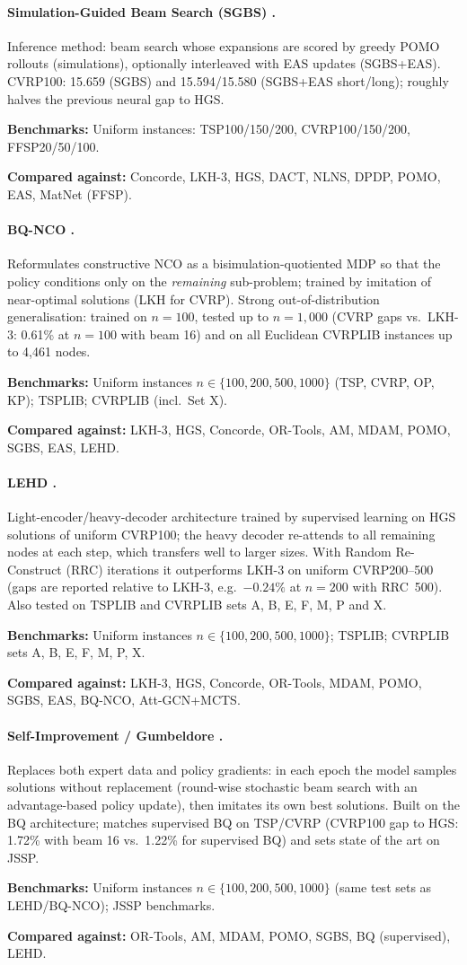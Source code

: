 \documentclass[11pt]{article}
\newcommand{\benchline}[1]{\par\smallskip\noindent\textbf{Benchmarks:} #1}
\newcommand{\baseline}[1]{\par\noindent\textbf{Compared against:} #1}
\begin{document}
\paragraph{Simulation-Guided Beam Search (SGBS) \citep{choo_simulation-guided_2022}.}
Inference method: beam search whose expansions are scored by greedy POMO rollouts
(simulations), optionally interleaved with EAS updates (SGBS+EAS). CVRP100: 15.659 (SGBS)
and 15.594/15.580 (SGBS+EAS short/long); roughly halves the previous neural gap to HGS.
\benchline{Uniform instances: TSP100/150/200, CVRP100/150/200, FFSP20/50/100.}
\baseline{Concorde, LKH-3, HGS, DACT, NLNS, DPDP, POMO, EAS, MatNet (FFSP).}

\paragraph{BQ-NCO \citep{drakulic_bq-nco_2023}.}
Reformulates constructive NCO as a bisimulation-quotiented MDP so that the policy
conditions only on the \emph{remaining} sub-problem; trained by imitation of near-optimal
solutions (LKH for CVRP). Strong out-of-distribution generalisation: trained on $n=100$,
tested up to $n=1{,}000$ (CVRP gaps vs.\ LKH-3: 0.61\% at $n{=}100$ with beam 16) and on
all Euclidean CVRPLIB instances up to 4{,}461 nodes.
\benchline{Uniform instances $n\in\{100,200,500,1000\}$ (TSP, CVRP, OP, KP); TSPLIB;
CVRPLIB (incl.\ Set X).}
\baseline{LKH-3, HGS, Concorde, OR-Tools, AM, MDAM, POMO, SGBS, EAS, LEHD.}

\paragraph{LEHD \citep{luo_neural_2023}.}
Light-encoder/heavy-decoder architecture trained by supervised learning on HGS solutions
of uniform CVRP100; the heavy decoder re-attends to all remaining nodes at each step,
which transfers well to larger sizes. With Random Re-Construct (RRC) iterations it
outperforms LKH-3 on uniform CVRP200--500 (gaps are reported relative to LKH-3, e.g.\
$-0.24\%$ at $n{=}200$ with RRC~500). Also tested on TSPLIB and CVRPLIB sets A, B, E, F,
M, P and X.
\benchline{Uniform instances $n\in\{100,200,500,1000\}$; TSPLIB; CVRPLIB sets A, B, E,
F, M, P, X.}
\baseline{LKH-3, HGS, Concorde, OR-Tools, MDAM, POMO, SGBS, EAS, BQ-NCO,
Att-GCN+MCTS.}

\paragraph{Self-Improvement / Gumbeldore \citep{pirnay_self-improvement_2024}.}
Replaces both expert data and policy gradients: in each epoch the model samples solutions
without replacement (round-wise stochastic beam search with an advantage-based policy
update), then imitates its own best solutions. Built on the BQ architecture; matches
supervised BQ on TSP/CVRP (CVRP100 gap to HGS: 1.72\% with beam 16 vs.\ 1.22\% for
supervised BQ) and sets state of the art on JSSP.
\benchline{Uniform instances $n\in\{100,200,500,1000\}$ (same test sets as
LEHD/BQ-NCO); JSSP benchmarks.}
\baseline{OR-Tools, AM, MDAM, POMO, SGBS, BQ (supervised), LEHD.}
\end{document}
